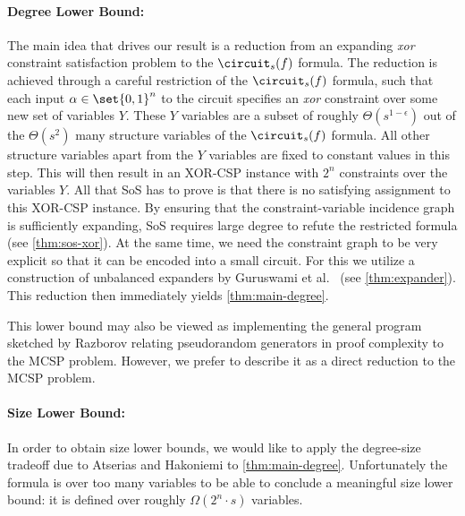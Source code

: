 \paragraph{Degree Lower Bound:}
The main idea that drives our result is a reduction from an expanding
\emph{xor} constraint satisfaction problem to the $\circuit_s(f)$
formula. The reduction is achieved through a careful restriction of
the $\circuit_s(f)$ formula, such that each input
$\alpha \in \set{0, 1}^n$ to the circuit specifies an \emph{xor}
constraint over some new set of variables $Y$.  These $Y$ variables
are a subset of roughly $\Theta(s^{1-\epsilon})$ out of the
$\Theta(s^2)$ many structure variables of the $\circuit_s(f)$ formula.
All other structure variables apart from the $Y$ variables are fixed
to constant values in this step.
This will then result
in an XOR-CSP instance with $2^n$ constraints over the variables
$Y$. All that SoS has to prove is that there is no satisfying
assignment to this XOR-CSP instance. By ensuring that the
constraint-variable incidence graph is sufficiently expanding, SoS
requires large degree to refute the restricted formula (see
\cref{thm:sos-xor}). At the same time, we need the constraint graph to
be very explicit so that it can be encoded into a small circuit.  For
this we utilize a construction of unbalanced expanders by Guruswami et
al.~\cite{GUV09Unbalanced} (see \cref{thm:expander}).  This reduction
then immediately yields \cref{thm:main-degree}.



This lower bound may also be viewed as implementing the general
program sketched by Razborov \cite{Razborov15PRG} relating pseudorandom
generators in proof complexity to the MCSP problem.  However, we prefer
to describe it as a direct reduction to the MCSP problem.

\paragraph{Size Lower Bound:}
In order to obtain size lower bounds, we would like to apply the
degree-size tradeoff due to Atserias and Hakoniemi
\cite{AH18SosTradeoff} to 
\cref{thm:main-degree}. Unfortunately the formula is
over too many variables to be able to conclude a meaningful size lower
bound: it is defined over roughly $\Omega(2^n \cdot s)$
variables.

